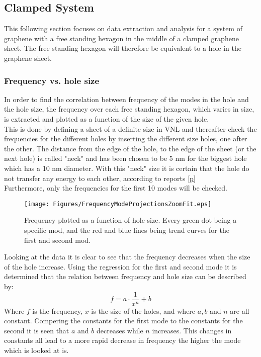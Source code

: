 \subsection{Clamped System}
This following section focuses on data extraction and analysis for a system of graphene with a free standing hexagon in the middle of a clamped graphene sheet. The free standing hexagon will therefore be equivalent to a hole in the graphene sheet.  
\subsubsection{Frequency vs. hole size}
In order to find the correlation between frequency of the modes in the hole and the hole size, the frequency over each free standing hexagon, which varies in size, is extracted and plotted as a function of the size of the given hole. \\
This is done by defining a sheet of a definite size in VNL and thereafter check the frequencies for the different holes by inserting the different size holes, one after the other. The distance from the edge of the hole, to the edge of the sheet (or the next hole) is called "neck" and has been chosen to be 5 nm for the biggest hole which has a 10 nm diameter. With this "neck" size it is certain that the hole do not transfer any energy to each other, according to reports \ref{p} \\
Furthermore, only the frequencies for the first 10 modes will be checked.
\onecolumngrid

\begin{figure}[H]
    \centering
    \texttt{[image: Figures/FrequencyModeProjectionsZoomFit.eps]}
    \caption{Frequency plotted as a function of hole size. Every green dot being a specific mod, and the red and blue lines being trend curves for the first and second mod.}
    \label{size vs frequency}
\end{figure}
\twocolumngrid
Looking at the data it is clear to see that the frequency decreases when the size of the hole increase. Using the regression for the first and second mode it is determined that the relation between frequency and hole size can be described by:
\begin{equation}
    f=a\cdot\dfrac{1}{x^n}+b
\end{equation}
Where $f$ is the frequency, $x$ is the size of the holes, and where $a, b$ and $n$ are all constant. Compering the constants for the first mode to the constants for the second it is seen that $a$ and $b$ decreases while $n$ increases. This changes in constants all lead to a more rapid decrease in frequency the higher the mode which is looked at is.